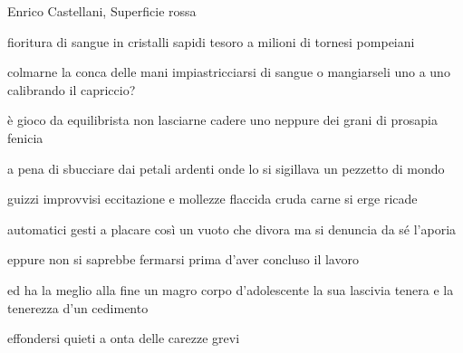\clearpage


\begin{artItem}
	Enrico Castellani, Superficie rossa
\end{artItem}

\begin{poem}
	\begin{stanza}
		fioritura di sangue\verseline
		in cristalli sapidi\verseline
		tesoro a milioni\verseline
		di tornesi pompeiani
	\end{stanza}

	\begin{stanza}
		colmarne la conca delle mani\verseline
		impiastricciarsi di sangue\verseline
		o mangiarseli uno a uno\verseline
		calibrando il capriccio?
	\end{stanza}

	\begin{stanza}
		è gioco da equilibrista\verseline
		non lasciarne cadere\verseline
		uno neppure dei grani\verseline
		di prosapia fenicia
	\end{stanza}

	\begin{stanza}
		a pena di sbucciare\verseline
		dai petali ardenti\verseline
		onde lo si sigillava\verseline
		un pezzetto di mondo
	\end{stanza}
\end{poem}

\clearpage


\begin{poem}
	\begin{stanza}
                guizzi improvvisi\verseline
                eccitazione e mollezze\verseline
                flaccida cruda carne si erge\verseline
                ricade
	\end{stanza}

	\begin{stanza}
                automatici gesti\verseline
                a placare così un vuoto che divora\verseline
                ma si denuncia da sé l’aporia
	\end{stanza}

	\begin{stanza}
                eppure non si saprebbe fermarsi prima d’aver concluso il lavoro
	\end{stanza}

	\begin{stanza}
                ed ha la meglio alla fine\verseline
                un magro corpo d’adolescente\verseline
                la sua lascivia tenera\verseline
                e la tenerezza d’un cedimento
	\end{stanza}

	\begin{stanza}
                effondersi quieti a onta delle carezze grevi
	\end{stanza}
\end{poem}

